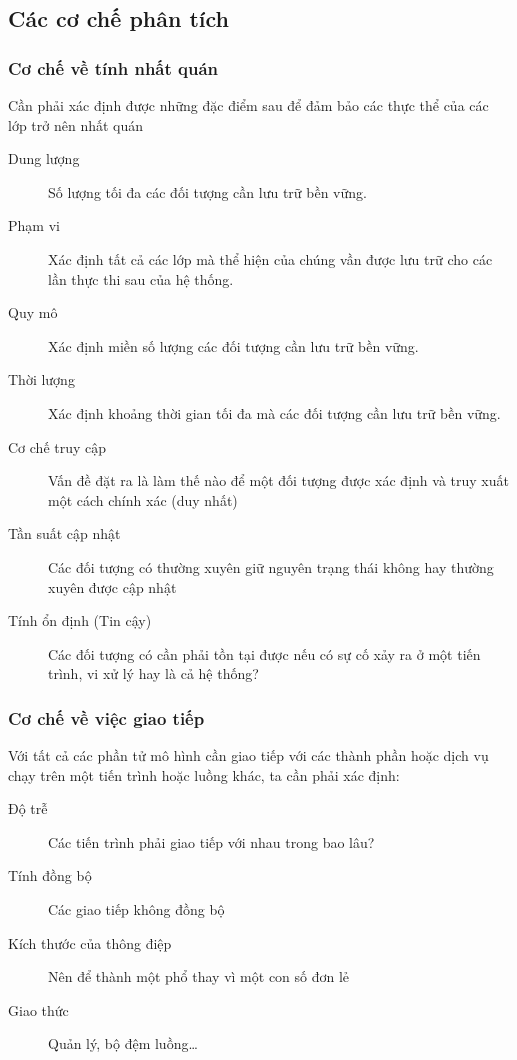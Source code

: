 \documentclass[./../main_file.tex]{subfiles}
\begin{document}
	
\subsection{Các cơ chế phân tích}
\subsubsection{Cơ chế về tính nhất quán}
Cần phải xác định được những đặc điểm sau để đảm bảo các thực thể của các lớp trở nên nhất quán
\begin{description}
	\item[Dung lượng] Số lượng tối đa các đối tượng cần lưu trữ bền vững. 
	\item[Phạm vi] Xác định tất cả các lớp mà thể hiện của chúng vần được lưu trữ cho các lần thực thi sau của hệ thống.
	\item[Quy mô] Xác định miền số lượng các đối tượng cần lưu trữ bền vững.
	\item[Thời lượng] Xác định khoảng thời gian tối đa mà các đối tượng cần lưu trữ bền vững.
	\item[Cơ chế truy cập] Vấn đề đặt ra là làm thế nào để một đối tượng được xác định và truy xuất một cách chính xác (duy nhất)
	\item[Tần suất cập nhật] Các đối tượng có thường xuyên giữ nguyên trạng thái không hay thường xuyên được cập nhật
	\item[Tính ổn định (Tin cậy)] Các đối tượng có cần phải tồn tại được nếu có sự cố xảy ra ở một tiến trình, vi xử lý hay là cả hệ thống?
\end{description}

\subsubsection{Cơ chế về việc giao tiếp}
Với tất cả các phần tử mô hình cần giao tiếp với các thành phần hoặc dịch vụ chạy trên một tiến trình hoặc luồng khác, ta cần phải xác định:
\begin{description}
	\item[Độ trễ] Các tiến trình phải giao tiếp với nhau trong bao lâu?
	\item[Tính đồng bộ] Các giao tiếp không đồng bộ
	\item[Kích thước của thông điệp] Nên để thành một phổ thay vì một con số đơn lẻ
	\item[Giao thức] Quản lý, bộ đệm luồng…
\end{description}
\end{document}
